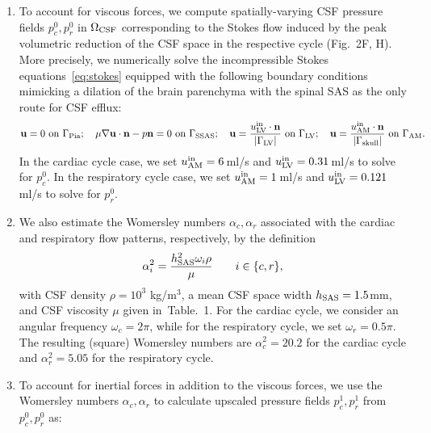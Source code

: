 \documentclass[fleqn,10pt]{wlscirep}
\begin{document}
\begin{enumerate}[label=\roman*)]
\item
  To account for viscous forces, we compute spatially-varying CSF
  pressure fields $p^0_c, p^0_r$ in $\Omega_{\rm CSF}$ corresponding
  to the Stokes flow induced by the peak volumetric reduction of the
  CSF space in the respective cycle (Fig.~2F, H). More
  precisely, we numerically solve the incompressible Stokes
  equations~\eqref{eq:stokes} equipped with the following boundary
  conditions mimicking a dilation of the brain parenchyma with the
  spinal SAS as the only route for CSF efflux:
  \begin{equation}\label{eq:pulsatility:bcs}
    \mathbf{u} = 0 \text{ on } \Gamma_{\rm Pia}; \quad 
    \mu \nabla \mathbf{u} \cdot \mathbf{n} - p \mathbf{n} = 0 \text{ on } \Gamma_{\rm SSAS}; \quad 
    \mathbf{u} = \frac{u^{\rm in}_{\rm LV} \cdot \mathbf{n}}{|\Gamma_{\rm LV}|} \text{ on } \Gamma_{\rm LV}; \quad
    \mathbf{u} = \frac{u^{\rm in}_{\rm AM} \cdot \mathbf{n}}{|\Gamma_{\rm skull}|} \text{ on } \Gamma_{\rm AM}.
\end{equation}
  In the cardiac cycle case, we set $u^{\rm in}_{\rm AM} = 6\,$ml/s \cite{causemann2022human,baledent2014imaging} and $u^{\rm in}_{\rm LV}=0.31\,$ml/s \cite{vinje2019respiratory} to solve for $p^0_c$. In the respiratory cycle case, we set $u^{\rm{in}}_{\rm{AM}} = 1\,$ml/s \cite{gutierrez2022effect} and $u^{\rm in}_{\rm{LV}}=0.121\,$ml/s \cite{liu2024using} to solve for $p^0_r$.
\item
  We also estimate the Womersley numbers $\alpha_c, \alpha_r$
  associated with the cardiac and respiratory flow patterns,
  respectively, by the definition
  \begin{equation}
    \alpha^2_i = \frac{h_{\rm SAS}^2 \omega_i \rho}{\mu} \qquad i \in \{c, r\},
  \end{equation}
  with CSF density $\rho = 10^3$ kg/m$^3$, a mean CSF space width $h_{\rm SAS} =
  1.5$mm, and CSF viscosity $\mu$ given in~Table.~1.  For
  the cardiac cycle, we consider an angular frequency $\omega_c = 2
  \pi$, while for the respiratory cycle, we set $\omega_r = 0.5
  \pi$. The resulting (square) Womersley numbers are $\alpha_c^2 = 20.2$
  for the cardiac cycle and $\alpha_r^2 = 5.05$ for the respiratory
  cycle.
\item
  To account for inertial forces in addition to the viscous forces, we
  use the Womersley numbers $\alpha_c, \alpha_r$ to calculate upscaled
  pressure fields $p^1_c, p^1_r$ from $p^0_c, p^0_r$ as:
  \begin{equation}

\end{equation}
\end{enumerate}
\end{document}
